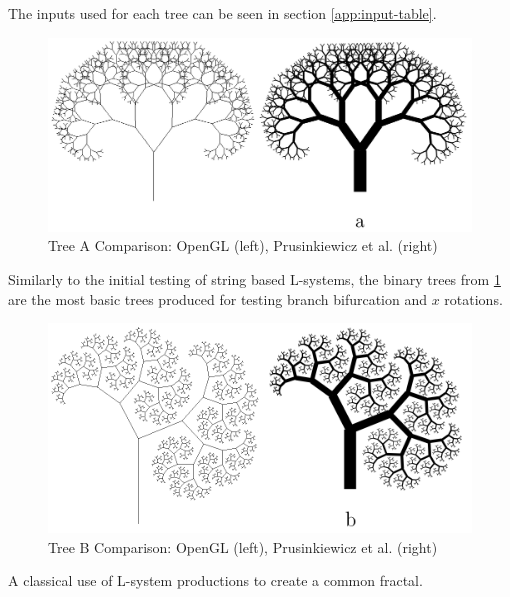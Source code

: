 \documentclass[final]{cmpreport}
\begin{document}
The inputs used for each tree can be seen in section \ref{app:input-table}.

\begin{figure}[ht]
    \includegraphics[scale=0.4]{tree-comp-a.png} 
    \centering
    \captionsetup{justification=centering}
    \caption{Tree A Comparison: OpenGL (left), Prusinkiewicz et al. (right)}
    \label{fig:tree-comp-a}
\end{figure}

Similarly to the initial testing of string based L-systems, the binary trees from \ref{fig:tree-comp-a}  
are the most basic trees produced for testing branch bifurcation and $x$ rotations.

\begin{figure}[ht]
    \includegraphics[scale=0.35]{tree-comp-b.png} 
    \centering
    \captionsetup{justification=centering}
    \caption{Tree B Comparison: OpenGL (left), Prusinkiewicz et al. (right)}
    \label{fig:tree-comp-b}
\end{figure}

A classical use of L-system productions to create a common fractal. 
\end{document}
